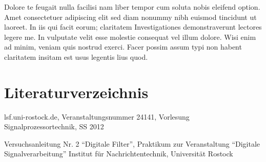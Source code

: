 \documentclass[a4paper,12pt,fontsize=12,DIV=12]{scrartcl}
\begin{document}
Dolore te feugait nulla facilisi nam liber tempor cum soluta nobis eleifend option. Amet consectetuer adipiscing elit sed diam nonummy nibh euismod tincidunt ut laoreet. In iis qui facit eorum; claritatem Investigationes demonstraverunt lectores legere me. In vulputate velit esse molestie consequat vel illum dolore. Wisi enim ad minim, veniam quis nostrud exerci. Facer possim assum typi non habent claritatem insitam est usus legentis lius quod.

\clearpage

\section{Literaturverzeichnis}

lsf.uni-rostock.de, Veranstaltungsnummer 24141, Vorlesung Signalprozessortechnik, SS 2012
\newline

Versuchsanleitung Nr. 2 "`Digitale Filter"', Praktikum zur Veranstaltung "`Digitale Signalverarbeitung"' Institut für Nachrichtentechnik, Universität Rostock
\end{document}
